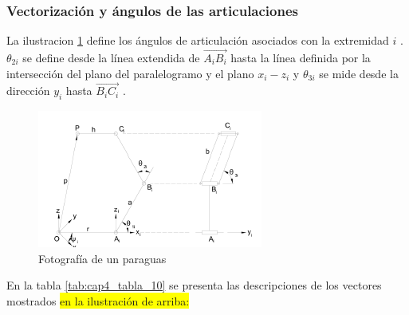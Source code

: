     \newpage

        \subsubsection{Vectorización y ángulos de las articulaciones} \label{cap4_angulosinteriores}
        
        La ilustracion \ref{f:Cap4_Metodo_A_Modelacion_Cinematica_Posicion_8} define los ángulos de articulación asociados con la extremidad  \( i \) .  \(  \theta _{2i} \)  se define desde la línea extendida de  \( \overrightarrow{A_{i}B_{i}} \)  hasta la línea definida por la intersección del plano del paralelogramo y el plano  \( x_{i}-z_{i} \)  y  \(  \theta _{3i} \)  se mide desde la dirección  \( y_{i} \)  hasta  \( \overrightarrow{B_{i}C_{i}} \) .
        
        \begin{figure}[htb]
             \centering
             \includegraphics[width=0.8\linewidth]{Main/Chapter4/Images4/Metodo_A_Modelacion_Cinematica_Posicion_8.png}
              \caption{Fotografía de un paraguas}
              \label{f:Cap4_Metodo_A_Modelacion_Cinematica_Posicion_8}
        \end{figure}
        
        
        En la tabla \ref{tab:cap4_tabla_10} se presenta las descripciones de los vectores mostrados \colorbox{Yellow}{en la ilustración de arriba:}
        
